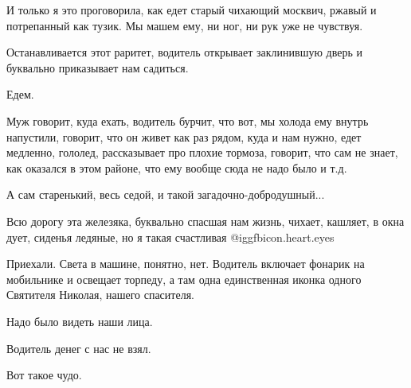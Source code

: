 И только я это проговорила, как едет старый чихающий москвич, ржавый и
потрепанный как тузик. Мы машем ему, ни ног, ни рук уже не чувствуя. 

Останавливается этот раритет, водитель открывает заклинившую дверь и буквально
приказывает нам садиться.

Едем. 

Муж говорит, куда ехать, водитель бурчит, что вот, мы холода ему внутрь
напустили, говорит, что он живет как раз рядом, куда и нам нужно, едет
медленно, гололед, рассказывает про плохие тормоза, говорит, что сам не знает,
как оказался в этом районе, что ему вообще сюда не надо было и т.д. 

А сам старенький, весь седой, и такой загадочно-добродушный...

Всю дорогу эта железяка, буквально спасшая нам жизнь, чихает, кашляет, в окна
дует, сиденья ледяные, но я такая счастливая @igg{fbicon.heart.eyes} 

Приехали. Света в машине, понятно, нет. Водитель включает фонарик на мобильнике
и освещает торпеду, а там одна единственная иконка одного Святителя Николая,
нашего спасителя. 

Надо было видеть наши лица.

Водитель денег с нас не взял.

Вот такое чудо.

